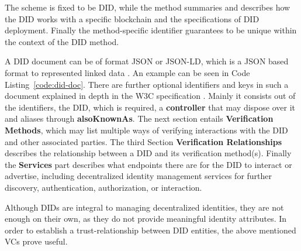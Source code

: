 The scheme is fixed to be DID, while the method summaries and describes how the DID works with a specific blockchain
and the specifications of DID deployment. Finally the method-specific identifier guarantees to be unique within the
context of the DID method.

A DID document can be of format JSON or JSON-LD, which is a JSON based format to represented linked data \cite{w3c2022did}.
An example can be seen in Code Listing~\ref{code:did-doc}. There are further optional identifiers and keys in such a
document explained in depth in the W3C specification \cite{w3c2022did}. Mainly it consists out of the identifiers, the
DID, which is required, a \textbf{controller} that may dispose over it and aliases through \textbf{alsoKnownAs}.
The next section entails \textbf{Verification Methods}, which may list multiple ways of verifying interactions with the
DID and other associated parties. The third Section \textbf{Verification Relationships} describes the relationship
between a DID and its verification method(s).
Finally the \textbf{Services} part describes what endpoints there are for the DID to interact or advertise, including
decentralized identity management services for further discovery, authentication, authorization, or interaction.

Although DIDs are integral to managing decentralized identities, they are not enough on their own, as they do not
provide meaningful identity attributes. In order to establish a trust-relationship between DID entities, the above
mentioned VCs prove useful. \cite{w3c2019verifiablecredentials}


